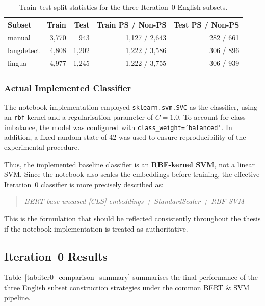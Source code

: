 \documentclass[11pt, titlepage, bibliography=totoc]{scrreprt}
\begin{document}
\begin{table}[h!]
\centering
\caption{Train--test split statistics for the three Iteration~0 English subsets.}
\label{tab:iter0_train_test_split}
\begin{tabular}{lrrrr}
\toprule
\textbf{Subset} & \textbf{Train} & \textbf{Test} & \textbf{Train PS / Non-PS} & \textbf{Test PS / Non-PS} \\
\midrule
manual     & 3,770 &   943 & 1,127 / 2,643 & 282 / 661 \\
langdetect & 4,808 & 1,202 & 1,222 / 3,586 & 306 / 896 \\
lingua     & 4,977 & 1,245 & 1,222 / 3,755 & 306 / 939 \\
\bottomrule
\end{tabular}
\end{table}


\subsubsection{Actual Implemented Classifier}

The notebook implementation employed \texttt{sklearn.svm.SVC} as the classifier, using an \texttt{rbf} kernel and a regularisation parameter of $C = 1.0$. To account for class imbalance, the model was configured with \texttt{class\_weight='balanced'}. In addition, a fixed random state of 42 was used to ensure reproducibility of the experimental procedure.

Thus, the implemented baseline classifier is an \textbf{RBF-kernel SVM}, not a linear SVM. Since the notebook also scales the embeddings before training, the effective Iteration~0 classifier is more precisely described as:

\begin{quote}
\textit{BERT-base-uncased [CLS] embeddings + StandardScaler + RBF SVM}
\end{quote}

This is the formulation that should be reflected consistently throughout the thesis if the notebook implementation is treated as authoritative.


\subsection{Iteration~0 Results}

Table~\ref{tab:iter0_comparison_summary} summarises the final performance of the three English subset construction strategies under the common BERT \& SVM pipeline.
\end{document}
